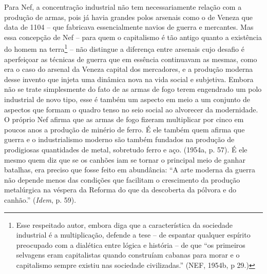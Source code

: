 Para Nef, a concentração industrial não tem necessariamente relação com
a produção de armas, pois já havia grandes polos arsenais como o de
Veneza que data de 1104 -- que fabricava essencialmente navios de guerra
e mercantes. Mas essa concepção de Nef -- para quem o capitalismo é tão
antigo quanto a existência do homem na terra\footnote{Esse respeitado
  autor, embora diga que a característica da sociedade industrial é a
  multiplicação, defende a tese -- de espantar qualquer espírito
  preocupado com a dialética entre lógica e história -- de que ``os
  primeiros selvagens eram capitalistas quando construíam cabanas para
  morar e o capitalismo sempre existiu nas sociedade civilizadas.''
  (NEF, 1954b, p 29.)} -- não distingue a diferença entre arsenais cujo
desafio é aperfeiçoar as técnicas de guerra que em essência continuavam
as mesmas, como era o caso do arsenal da Veneza capital dos mercadores,
e a produção moderna desse invento que injeta uma dinâmica nova na vida
social e subjetiva. Embora não se trate simplesmente do fato de as armas
de fogo terem engendrado um polo industrial de novo tipo, esse é também
um aspecto em meio a um conjunto de aspectos que formam o quadro tenso
no seio social ao alvorecer da modernidade. O próprio Nef afirma que as
armas de fogo fizeram multiplicar por cinco em poucos anos a produção de
minério de ferro. É ele também quem afirma que guerra e o industrialismo
moderno são também fundados na produção de prodigiosas quantidades de
metal, sobretudo ferro e aço. (1954a, p. 57). É ele mesmo quem diz que
se os canhões iam se tornar o principal meio de ganhar batalhas, era
preciso que fosse feito em abundância: ``A arte moderna da guerra não
depende menos das condições que facilitam o crescimento da produção
metalúrgica na véspera da Reforma do que da descoberta da pólvora e do
canhão.'' (\emph{Idem}, p. 59).


